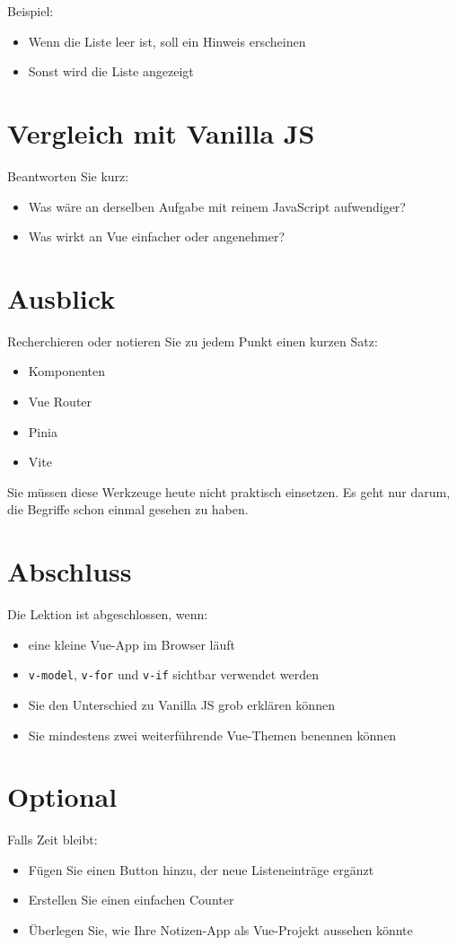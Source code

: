 \documentclass[a4paper,12pt]{article}
\begin{document}
Beispiel:
\begin{itemize}
    \item Wenn die Liste leer ist, soll ein Hinweis erscheinen
    \item Sonst wird die Liste angezeigt
\end{itemize}

\section{Vergleich mit Vanilla JS}

Beantworten Sie kurz:
\begin{itemize}
    \item Was wäre an derselben Aufgabe mit reinem JavaScript aufwendiger?
    \item Was wirkt an Vue einfacher oder angenehmer?
\end{itemize}

\section{Ausblick}

Recherchieren oder notieren Sie zu jedem Punkt einen kurzen Satz:
\begin{itemize}
    \item Komponenten
    \item Vue Router
    \item Pinia
    \item Vite
\end{itemize}

Sie müssen diese Werkzeuge heute nicht praktisch einsetzen. Es geht nur darum, die Begriffe schon einmal gesehen zu haben.

\section{Abschluss}

Die Lektion ist abgeschlossen, wenn:
\begin{itemize}
    \item eine kleine Vue-App im Browser läuft
    \item \texttt{v-model}, \texttt{v-for} und \texttt{v-if} sichtbar verwendet werden
    \item Sie den Unterschied zu Vanilla JS grob erklären können
    \item Sie mindestens zwei weiterführende Vue-Themen benennen können
\end{itemize}

\section{Optional}

Falls Zeit bleibt:
\begin{itemize}
    \item Fügen Sie einen Button hinzu, der neue Listeneinträge ergänzt
    \item Erstellen Sie einen einfachen Counter
    \item Überlegen Sie, wie Ihre Notizen-App als Vue-Projekt aussehen könnte
\end{itemize}
\end{document}
